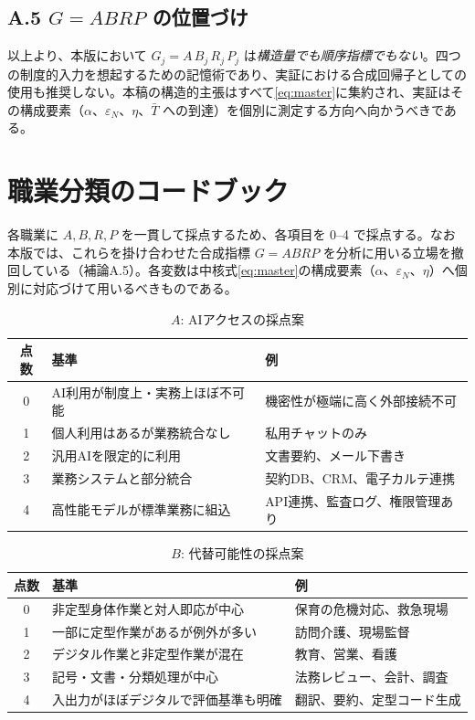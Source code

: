 \documentclass[11pt]{article}
\theoremstyle{plain}
\theoremstyle{definition}
\theoremstyle{remark}
\begin{document}
\subsection*{A.5 $G=ABRP$ の位置づけ}
以上より、本版において $G_j=A\,B_j\,R_j\,P_j$ は\emph{構造量でも順序指標でもない}。四つの制度的入力を想起するための記憶術であり、実証における合成回帰子としての使用も推奨しない。本稿の構造的主張はすべて\eqref{eq:master}に集約され、実証はその構成要素（$\alpha$、$\varepsilon_N$、$\eta$、$\bar T$ への到達）を個別に測定する方向へ向かうべきである。

\section{職業分類のコードブック}
各職業に $A,B,R,P$ を一貫して採点するため、各項目を 0--4 で採点する。なお本版では、これらを掛け合わせた合成指標 $G=ABRP$ を分析に用いる立場を撤回している（補論A.5）。各変数は中核式\eqref{eq:master}の構成要素（$\alpha$、$\varepsilon_N$、$\eta$）へ個別に対応づけて用いるべきものである。

\begin{table}[h]\centering\small
\caption{$A$: AIアクセスの採点案}\label{tab:cbA}
\begin{tabularx}{\textwidth}{@{}clX@{}}\toprule
点数 & 基準 & 例 \\ \midrule
0 & AI利用が制度上・実務上ほぼ不可能 & 機密性が極端に高く外部接続不可 \\
1 & 個人利用はあるが業務統合なし & 私用チャットのみ \\
2 & 汎用AIを限定的に利用 & 文書要約、メール下書き \\
3 & 業務システムと部分統合 & 契約DB、CRM、電子カルテ連携 \\
4 & 高性能モデルが標準業務に組込 & API連携、監査ログ、権限管理あり \\
\bottomrule\end{tabularx}
\end{table}

\begin{table}[h]\centering\small
\caption{$B$: 代替可能性の採点案}\label{tab:cbB}
\begin{tabularx}{\textwidth}{@{}clX@{}}\toprule
点数 & 基準 & 例 \\ \midrule
0 & 非定型身体作業と対人即応が中心 & 保育の危機対応、救急現場 \\
1 & 一部に定型作業があるが例外が多い & 訪問介護、現場監督 \\
2 & デジタル作業と非定型作業が混在 & 教育、営業、看護 \\
3 & 記号・文書・分類処理が中心 & 法務レビュー、会計、調査 \\
4 & 入出力がほぼデジタルで評価基準も明確 & 翻訳、要約、定型コード生成 \\
\bottomrule\end{tabularx}
\end{table}
\end{document}
